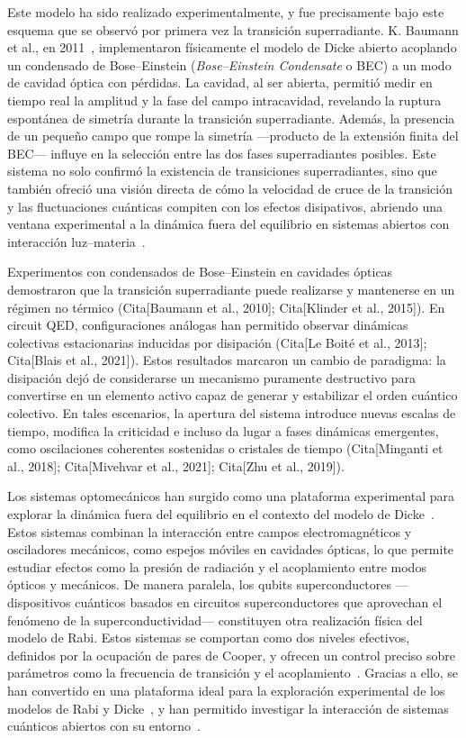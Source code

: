 \documentclass[onecolumn,notitlepage,letterpaper,aps,pra,12pt]{article}
\numberwithin{equation}{section}
\begin{document}
Este modelo ha sido realizado experimentalmente, y fue precisamente bajo este esquema que se observó por primera vez la transición superradiante. K. Baumann et al., en 2011~\cite{Baumann11}, implementaron físicamente el modelo de Dicke abierto acoplando un condensado de Bose–Einstein (\textit{Bose–Einstein Condensate} o BEC) a un modo de cavidad óptica con pérdidas. La cavidad, al ser abierta, permitió medir en tiempo real la amplitud y la fase del campo intracavidad, revelando la ruptura espontánea de simetría durante la transición superradiante. Además, la presencia de un pequeño campo que rompe la simetría —producto de la extensión finita del BEC— influye en la selección entre las dos fases superradiantes posibles. Este sistema no solo confirmó la existencia de transiciones superradiantes, sino que también ofreció una visión directa de cómo la velocidad de cruce de la transición y las fluctuaciones cuánticas compiten con los efectos disipativos, abriendo una ventana experimental a la dinámica fuera del equilibrio en sistemas abiertos con interacción luz–materia~\cite{Baumann10}.


Experimentos con condensados de Bose–Einstein en cavidades ópticas demostraron que la transición superradiante puede realizarse y mantenerse en un régimen no térmico (Cita[Baumann et al., 2010]; Cita[Klinder et al., 2015]). En circuit QED, configuraciones análogas han permitido observar dinámicas colectivas estacionarias inducidas por disipación (Cita[Le Boité et al., 2013]; Cita[Blais et al., 2021]). Estos resultados marcaron un cambio de paradigma: la disipación dejó de considerarse un mecanismo puramente destructivo para convertirse en un elemento activo capaz de generar y estabilizar el orden cuántico colectivo. En tales escenarios, la apertura del sistema introduce nuevas escalas de tiempo, modifica la criticidad e incluso da lugar a fases dinámicas emergentes, como oscilaciones coherentes sostenidas o cristales de tiempo (Cita[Minganti et al., 2018]; Cita[Mivehvar et al., 2021]; Cita[Zhu et al., 2019]).


Los sistemas optomecánicos han surgido como una plataforma experimental  para explorar la dinámica fuera del equilibrio en el contexto del modelo de Dicke~\cite{debnath2015}. Estos sistemas combinan la interacción entre campos electromagnéticos y osciladores mecánicos, como espejos móviles en cavidades ópticas, lo que permite estudiar efectos como la presión de radiación y el acoplamiento entre modos ópticos y mecánicos. De manera paralela, los qubits superconductores —dispositivos cuánticos basados en circuitos superconductores que aprovechan el fenómeno de la superconductividad— constituyen otra realización física del modelo de Rabi. Estos sistemas se comportan como dos niveles efectivos, definidos por la ocupación de pares de Cooper, y ofrecen un control preciso sobre parámetros como la frecuencia de transición y el acoplamiento~\cite{Lamata2017}. Gracias a ello, se han convertido en una plataforma ideal para la exploración experimental de los modelos de Rabi y Dicke~\cite{Mezzacapo14}, y han permitido investigar la interacción de sistemas cuánticos abiertos con su entorno~\cite{hwang2018,Lo2021}.
\end{document}
